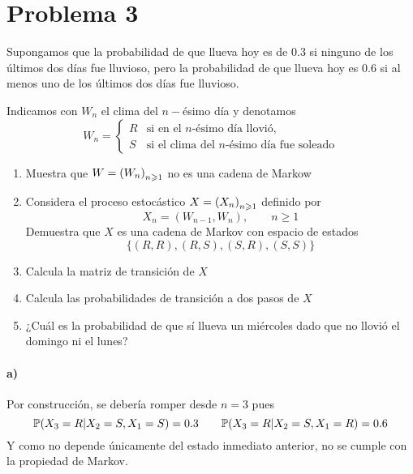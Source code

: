 \documentclass[a4paper,12pt]{article}
\begin{document}
\section{Problema 3}
\begin{displayquote}
    Supongamos que la probabilidad de que llueva hoy es de $0.3$ si ninguno de los últimos dos días fue lluvioso, pero la probabilidad de que llueva hoy es $0.6$ si al menos uno de los últimos dos días fue lluvioso.
    \par Indicamos con $W_n$ el clima del $n-$ésimo día y denotamos
    \[W_n=\begin{cases}
        R& \text{si en el $n$-ésimo día llovió,}\\
        S& \text{si el clima del $n$-ésimo día fue soleado}
    \end{cases}\]
    \begin{enumerate}
        \item Muestra que $W=\cdm{W_n}$ no es una cadena de Markow
        \item Considera el proceso estocástico $X=\cdm{X_n}$ definido por
        \[X_n= (W_{n-1},W_n),\qquad n\geqslant 1\]
        Demuestra que $X$ es una cadena de Markov con espacio de estados 
        \[\{(R,R),(R,S),(S,R),(S,S)\}\]
        \item Calcula la matriz de transición de $X$
        \item Calcula las probabilidades de transición a dos pasos de $X$
        \item ¿Cuál es la probabilidad de que sí llueva un miércoles dado que no llovió el domingo ni el lunes?
    \end{enumerate}
\end{displayquote}
\paragraph{a)} Por construcción, se debería romper desde $n=3$ pues
\[\mathbb{P}(X_3=R|X_2=S,X_1=S)=0.3\qquad \mathbb{P}(X_3=R|X_2=S,X_1=R)=0.6\]
Y como no depende únicamente del estado inmediato anterior, no se cumple con la propiedad de Markov.
\end{document}
